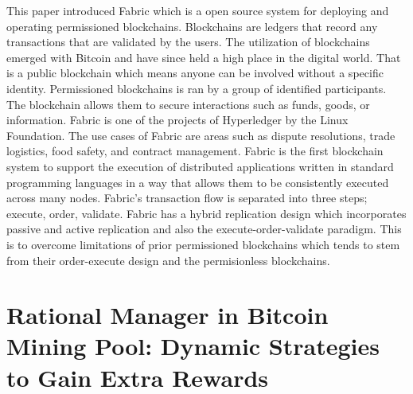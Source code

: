 \documentclass{article}
\begin{document}
This paper introduced Fabric which is a open source system for deploying and operating permissioned blockchains. Blockchains are ledgers that record any transactions that are validated by the users. The utilization of blockchains emerged with Bitcoin and have since held a high place in the digital world. That is a public blockchain which means anyone can be involved without a specific identity. Permissioned blockchains is ran by a group of identified participants. The blockchain allows them to secure interactions such as funds, goods, or information. Fabric is one of the projects of Hyperledger by the Linux Foundation. The use cases of Fabric are areas such as dispute resolutions, trade logistics, food safety, and contract management. Fabric is the first blockchain system to support the execution of distributed applications written in standard programming languages in a way that allows them to be consistently executed across many nodes. Fabric's transaction flow is separated into three steps; execute, order, validate. Fabric has a hybrid replication design which incorporates passive and active replication and also the execute-order-validate paradigm. This is to overcome limitations of prior permissioned blockchains which tends to stem from their order-execute design and the permisionless blockchains. 

\section{Rational Manager in Bitcoin Mining Pool: Dynamic Strategies to Gain Extra Rewards \cite{Rational}}
\end{document}
